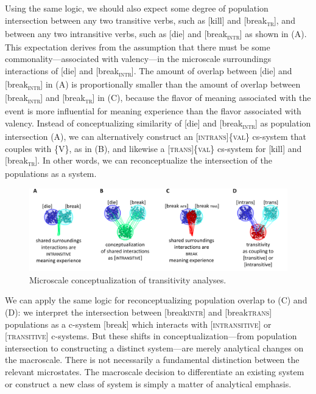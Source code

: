   Using the same logic, we should also expect some degree of population intersection between any two transitive verbs, such as [kill] and [break\textsc{\textsubscript{tr}}], and between any two intransitive verbs, such as [die] and [break\textsc{\textsubscript{intr}}] as shown in (A). This expectation derives from the assumption that there must be some commonality—associated with valency—in the microscale surroundings interactions of [die] and [break\textsc{\textsubscript{intr}}]. The amount of overlap between [die] and [break\textsc{\textsubscript{intr}}] in (A) is proportionally smaller than the amount of overlap between [break\textsc{\textsubscript{intr}}] and [break\textsc{\textsubscript{tr}}] in (C), because the flavor of meaning associated with the event is more influential for meaning experience than the flavor associated with valency. Instead of conceptualizing similarity of [die] and [break\textsc{\textsubscript{intr}}] as population intersection (A), we can alternatively construct an [\textsc{intrans}]\{\textsc{val}\} cs-system that couples with \{V\}, as in (B), and likewise a [\textsc{trans}]\{\textsc{val}\} cs-system for [kill] and [break\textsc{\textsubscript{tr}}]. In other words, we can reconceptualize the intersection of the populations as a system.

  
\begin{figure}
\includegraphics[width=\textwidth]{figures/Tilsen-img73.png}
\caption{Microscale conceptualization of transitivity analyses.}
\label{fig:4:23}
\end{figure}
 

  We can apply the same logic for reconceptualizing population overlap to (C) and (D): we interpret the intersection between [break\textsc{intr}] and [break\textsc{trans}] populations as a c-system [break] which interacts with [\textsc{intransitive}] or [\textsc{transitive}] c-systems. But these shifts in conceptualization—from population intersection to constructing a distinct system—are merely analytical changes on the macroscale. There is not necessarily a fundamental distinction between the relevant microstates. The macroscale decision to differentiate an existing system or construct a new class of system is simply a matter of analytical emphasis.

